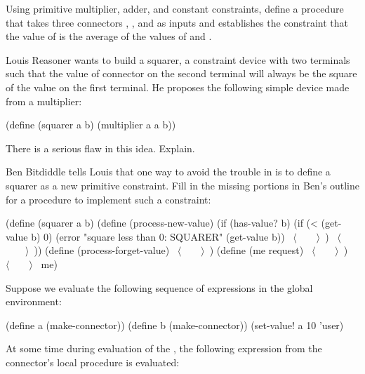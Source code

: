 \begin{exerciseGroup}
\label{Exercise 3.33}
 Using primitive multiplier,
adder, and constant constraints, define a procedure  that takes
three connectors , , and  as inputs and establishes the
constraint that the value of  is the average of the values of 
and .

\label{Exercise 3.34}
 Louis Reasoner wants to build a
squarer, a constraint device with two terminals such that the value of
connector  on the second terminal will always be the square of the
value  on the first terminal.  He proposes the following simple device
made from a multiplier:

\begin{codeBlock}
(define (squarer a b)
  (multiplier a a b))
\end{codeBlock}

There is a serious flaw in this idea.  Explain.

\label{Exercise 3.35}
 Ben Bitdiddle tells Louis that
one way to avoid the trouble in  is to define a squarer as a
new primitive constraint.  Fill in the missing portions in Ben's outline for a
procedure to implement such a constraint:

\begin{codeBlock}
(define (squarer a b)
  (define (process-new-value)
    (if (has-value? b)
        (if (< (get-value b) 0)
            (error "square less than 0: SQUARER"
                   (get-value b))
            ~\(\langle \)~~~~\(\rangle \)~)
        ~\(\langle \)~~~~\(\rangle \)~))
  (define (process-forget-value) ~\(\langle \)~~~~\(\rangle \)~)
  (define (me request) ~\(\langle \)~~~~\(\rangle \)~)
  ~\(\langle \)~~~~\(\rangle \)~
  me)
\end{codeBlock}

\label{Exercise 3.36}
 Suppose we evaluate the following
sequence of expressions in the global environment:

\begin{codeBlock}
(define a (make-connector))
(define b (make-connector))
(set-value! a 10 'user)
\end{codeBlock}

At some time during evaluation of the , the following
expression from the connector's local procedure is evaluated:


\end{exerciseGroup}
